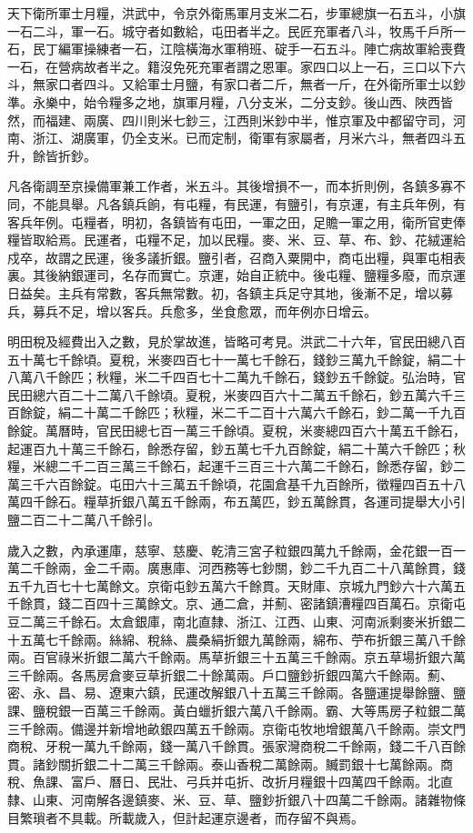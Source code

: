 天下衛所軍士月糧，洪武中，令京外衛馬軍月支米二石，步軍總旗一石五斗，小旗一石二斗，軍一石。城守者如數給，屯田者半之。民匠充軍者八斗，牧馬千戶所一石，民丁編軍操練者一石，江陰橫海水軍稍班、碇手一石五斗。陣亡病故軍給喪費一石，在營病故者半之。籍沒免死充軍者謂之恩軍。家四口以上一石，三口以下六斗，無家口者四斗。又給軍士月鹽，有家口者二斤，無者一斤，在外衛所軍士以鈔準。永樂中，始令糧多之地，旗軍月糧，八分支米，二分支鈔。後山西、陜西皆然，而福建、兩廣、四川則米七鈔三，江西則米鈔中半，惟京軍及中都留守司，河南、浙江、湖廣軍，仍全支米。已而定制，衛軍有家屬者，月米六斗，無者四斗五升，餘皆折鈔。

凡各衛調至京操備軍兼工作者，米五斗。其後增損不一，而本折則例，各鎮多寡不同，不能具舉。凡各鎮兵餉，有屯糧，有民運，有鹽引，有京運，有主兵年例，有客兵年例。屯糧者，明初，各鎮皆有屯田，一軍之田，足贍一軍之用，衛所官吏俸糧皆取給焉。民運者，屯糧不足，加以民糧。麥、米、豆、草、布、鈔、花絨運給戍卒，故謂之民運，後多議折銀。鹽引者，召商入粟開中，商屯出糧，與軍屯相表裏。其後納銀運司，名存而實亡。京運，始自正統中。後屯糧、鹽糧多廢，而京運日益矣。主兵有常數，客兵無常數。初，各鎮主兵足守其地，後漸不足，增以募兵，募兵不足，增以客兵。兵愈多，坐食愈眾，而年例亦日增云。

明田稅及經費出入之數，見於掌故進，皆略可考見。洪武二十六年，官民田總八百五十萬七千餘頃。夏稅，米麥四百七十一萬七千餘石，錢鈔三萬九千餘錠，絹二十八萬八千餘匹；秋糧，米二千四百七十二萬九千餘石，錢鈔五千餘錠。弘治時，官民田總六百二十二萬八千餘頃。夏稅，米麥四百六十二萬五千餘石，鈔五萬六千三百餘錠，絹二十萬二千餘匹；秋糧，米二千二百十六萬六千餘石，鈔二萬一千九百餘錠。萬曆時，官民田總七百一萬三千餘頃。夏稅，米麥總四百六十萬五千餘石，起運百九十萬三千餘石，餘悉存留，鈔五萬七千九百餘錠，絹二十萬六千餘匹；秋糧，米總二千二百三萬三千餘石，起運千三百三十六萬二千餘石，餘悉存留，鈔二萬三千六百餘錠。屯田六十三萬五千餘頃，花園倉基千九百餘所，徵糧四百五十八萬四千餘石。糧草折銀八萬五千餘兩，布五萬匹，鈔五萬餘貫，各運司提舉大小引鹽二百二十二萬八千餘引。

歲入之數，內承運庫，慈寧、慈慶、乾清三宮子粒銀四萬九千餘兩，金花銀一百一萬二千餘兩，金二千兩。廣惠庫、河西務等七鈔關，鈔二千九百二十八萬餘貫，錢五千九百七十七萬餘文。京衛屯鈔五萬六千餘貫。天財庫、京城九門鈔六十六萬五千餘貫，錢二百四十三萬餘文。京、通二倉，并薊、密諸鎮漕糧四百萬石。京衛屯豆二萬三千餘石。太倉銀庫，南北直隸、浙江、江西、山東、河南派剩麥米折銀二十五萬七千餘兩。絲綿、稅絲、農桑絹折銀九萬餘兩，綿布、苧布折銀三萬八千餘兩。百官祿米折銀二萬六千餘兩。馬草折銀三十五萬三千餘兩。京五草場折銀六萬三千餘兩。各馬房倉麥豆草折銀二十餘萬兩。戶口鹽鈔折銀四萬六千餘兩。薊、密、永、昌、易、遼東六鎮，民運改解銀八十五萬三千餘兩。各鹽運提舉餘鹽、鹽課、鹽稅銀一百萬三千餘兩。黃白蠟折銀六萬八千餘兩。霸、大等馬房子粒銀二萬三千餘兩。備邊并新增地畝銀四萬五千餘兩。京衛屯牧地增銀萬八千餘兩。崇文門商稅、牙稅一萬九千餘兩，錢一萬八千餘貫。張家灣商稅二千餘兩，錢二千八百餘貫。諸鈔關折銀二十二萬三千餘兩。泰山香稅二萬餘兩。贓罰銀十七萬餘兩。商稅、魚課、富戶、曆日、民壯、弓兵并屯折、改折月糧銀十四萬四千餘兩。北直隸、山東、河南解各邊鎮麥、米、豆、草、鹽鈔折銀八十四萬二千餘兩。諸雜物條目繁瑣者不具載。所載歲入，但計起運京邊者，而存留不與焉。

